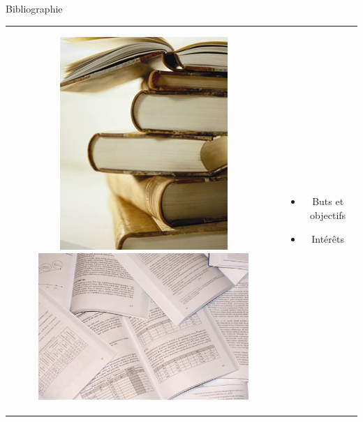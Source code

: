 \documentclass{beamer}
\begin{document}
\begin{frame}{Bibliographie}

  \begin{tabular}{c c}
    \begin{minipage}{0.4\linewidth}
      \begin{figure}
        \includegraphics[width=0.6\linewidth]{images/bibliographie.jpg}
        \vspace{3mm}
        \includegraphics[width=0.9\linewidth]{images/publications.jpg}
      \end{figure}
    \end{minipage}
    &
    \begin{minipage}{0.6\linewidth}
      \begin{itemize}
      \item Buts et objectifs
      \item Intérêts %

\end{itemize}
\end{minipage}
\end{tabular}
\end{frame}
\end{document}
